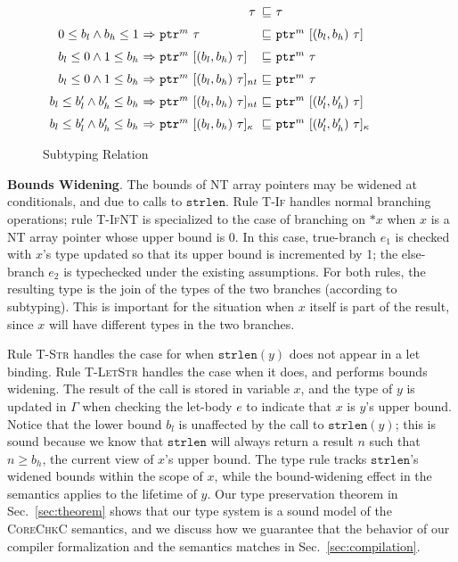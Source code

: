 \documentclass[conference]{IEEEtran}
\newenvironment{DIFnomarkup}{}{}
\newcommand{\myparagraph}[1]{\textbf{#1}.\xspace}
\newcommand{\CoreChkC}{\textsc{CoreChkC}\xspace}
\newcommand{\kw}[1]{\ensuremath{\mathtt{#1}}}
\newcommand{\estrlentext}{\ensuremath{\kw{strlen}}}
\newcommand{\tarray}[3]{\tarrayb{({#1},{#2})}{#3}}
\newcommand{\tarrayb}[2]{\ensuremath{[{#1}~{#2}]}}
\newcommand{\tntarray}[3]{\tntarrayb{({#1},{#2})}{#3}}
\newcommand{\tntarrayb}[2]{\tarrayb{#1}{#2}_{nt}}
\newcommand{\tallarrayb}[2]{\ensuremath{[{#1}~{#2}]_{\kappa}}}
\newcommand{\tallarray}[3]{\tallarrayb{({#1},{#2})}{#3}}
\newcommand{\tptr}[2]{\ensuremath{\mathtt{ptr}^{#2}~{#1}}}
\newcommand{\tarrayptr}[4]{{\tptr{\tarray{#1}{#2}{#3}}{#4}}}
\newcommand{\tntarrayptr}[4]{{\tptr{\tntarray{#1}{#2}{#3}}{#4}}}
\newcommand{\tallarrayptr}[4]{{\tptr{\tallarray{#1}{#2}{#3}}{#4}}}
\newcommand{\estar}[1]{\ensuremath{\texttt{*}{#1}}}
\begin{document}
\begin{DIFnomarkup}
\begin{figure}
{\small
\begin{center}
  $\begin{array}{r@{~}c@{~}l@{~}c@{~}l}
    &&\multicolumn{1}{r}{\tau} &\sqsubseteq& \tau\\[0.6em]
    0\le b_l \wedge b_h \le 1 &\Rightarrow& \tptr{\tau}{m}&\sqsubseteq& \tarrayptr{b_l}{b_h}{\tau}{m}\\[0.6em]
    b_l \le 0 \wedge 1 \le b_h &\Rightarrow& \tarrayptr{b_l}{b_h}{\tau}{m} &\sqsubseteq& \tptr{\tau}{m}\\[0.6em]
    b_l \le 0 \wedge 1 \le b_h &\Rightarrow& \tntarrayptr{b_l}{b_h}{\tau}{m} &\sqsubseteq& \tptr{\tau}{m}\\[0.6em]
b_l \le b_l' \wedge b_h' \le b_h &\Rightarrow& \tntarrayptr{b_l}{b_h}{\tau}{m} &\sqsubseteq& \tarrayptr{b_l'}{b_h'}{\tau}{m}\\[0.6em]
    b_l \le b_l' \wedge b_h' \le b_h &\Rightarrow& \tallarrayptr{b_l}{b_h}{\tau}{m} &\sqsubseteq& \tallarrayptr{b_l'}{b_h'}{\tau}{m}
    \end{array}
  $
\end{center}
}
  \caption{Subtyping Relation}
  \label{fig:checkc-subtype}
\end{figure}
\end{DIFnomarkup}

\myparagraph{Bounds Widening}
The bounds of NT array pointers may be widened at conditionals, and
due to calls to $\estrlentext$.  Rule \textsc{T-If} handles normal
branching operations; rule \textsc{T-IfNT} is specialized to the case
of branching on $\estar{x}$ when $x$ is a NT array pointer whose upper
bound is 0. In this case, true-branch $e_1$ is checked with $x$'s type
updated so that its upper bound is incremented by 1; the else-branch
$e_2$ is typechecked under the existing assumptions. For both rules,
the resulting type is the join of the types of the two branches
(according to subtyping). This is important for the situation when $x$
itself is part of the result, since $x$ will have
different types in the two branches.

Rule \textsc{T-Str} handles the case for when $\estrlentext(y)$ does
not appear in a let binding. Rule \textsc{T-LetStr} handles the case
when it does, and performs bounds widening. The result of the call is
stored in variable $x$, and the type of $y$ is updated in $\Gamma$ when
checking the let-body $e$ to indicate that $x$ is $y$'s upper
bound. Notice that the lower bound $b_l$ is unaffected by the call to
$\estrlentext(y)$; this is sound because we know that $\estrlentext$
will always return a result $n$ such that $n \ge b_h$, the current
view of $x$'s upper bound.
The type rule tracks $\estrlentext$'s widened bounds
within the scope of $x$, while the bound-widening effect in the semantics applies to the lifetime of $y$.
Our type preservation theorem in Sec.~\ref{sec:theorem}
shows that our type system is a sound model of the \CoreChkC semantics,
and we discuss how we guarantee that the behavior of our compiler formalization and the semantics matches in Sec.~\ref{sec:compilation}.
\end{document}
